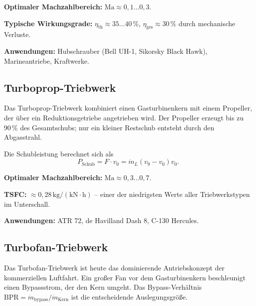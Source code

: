 ﻿\documentclass[12pt,a4paper]{article}
\theoremstyle{remark}
\newcommand{\Ma}{\mathrm{Ma}}
\newcommand{\BPR}{\mathrm{BPR}}
\newcommand{\etath}{\eta_{\mathrm{th}}}
\newcommand{\etages}{\eta_{\mathrm{ges}}}
\begin{document}
\textbf{Optimaler Machzahlbereich:} $\Ma \approx 0{,}1 \ldots 0{,}3$.

\textbf{Typische Wirkungsgrade:} $\etath \approx 35\ldots 40\,\%$,
$\etages \approx 30\,\%$ durch mechanische Verluste.

\textbf{Anwendungen:} Hubschrauber (Bell UH-1, Sikorsky Black Hawk),
Marineantriebe, Kraftwerke.

\subsection{Turboprop-Triebwerk}

Das Turboprop-Triebwerk kombiniert einen Gasturbinenkern mit einem Propeller,
der \"uber ein Reduktionsgetriebe angetrieben wird.
Der Propeller erzeugt bis zu $90\,\%$ des Gesamtschubs;
nur ein kleiner Restschub entsteht durch den Abgasstrahl.

Die Schubleistung berechnet sich als
\begin{equation}
  P_{\mathrm{Schub}} = F \cdot v_0 = \dot{m}_L (v_9 - v_0) v_0.
  \label{eq:turboprop_power}
\end{equation}

\textbf{Optimaler Machzahlbereich:} $\Ma \approx 0{,}3 \ldots 0{,}7$.

\textbf{TSFC:} $\approx 0{,}28\,\mathrm{kg/(kN \cdot h)}$ -- einer der niedrigsten Werte aller Triebwerkstypen im Unterschall.

\textbf{Anwendungen:} ATR 72, de Havilland Dash 8, C-130 Hercules.

\subsection{Turbofan-Triebwerk}

Das Turbofan-Triebwerk ist heute das dominierende Antriebskonzept
der kommerziellen Luftfahrt.
Ein gro{\ss}er Fan vor dem Gasturbinenkern beschleunigt einen
Bypassstrom, der den Kern umgeht.
Das Bypass-Verh\"altnis $\BPR = \dot{m}_{\mathrm{bypass}} / \dot{m}_{\mathrm{Kern}}$
ist die entscheidende Auslegungsgr\"o{\ss}e.
\end{document}

